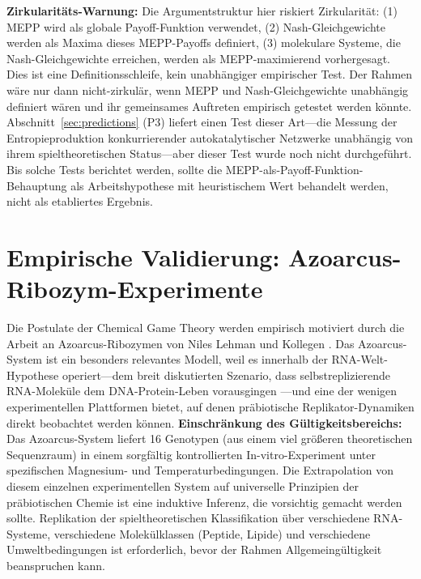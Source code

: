 \documentclass[12pt,a4paper]{article}
\theoremstyle{remark}
\begin{document}
\textbf{Zirkularit\"ats-Warnung:} Die Argumentstruktur hier riskiert Zirkularit\"at: (1) MEPP wird als globale Payoff-Funktion verwendet, (2) Nash-Gleichgewichte werden als Maxima dieses MEPP-Payoffs definiert, (3) molekulare Systeme, die Nash-Gleichgewichte erreichen, werden als MEPP-maximierend vorhergesagt. Dies ist eine Definitionsschleife, kein unabh\"angiger empirischer Test. Der Rahmen w\"are nur dann nicht-zirkul\"ar, wenn MEPP und Nash-Gleichgewichte unabh\"angig definiert w\"aren und ihr gemeinsames Auftreten empirisch getestet werden k\"onnte. Abschnitt~\ref{sec:predictions} (P3) liefert einen Test dieser Art---die Messung der Entropieproduktion konkurrierender autokatalytischer Netzwerke unabh\"angig von ihrem spieltheoretischen Status---aber dieser Test wurde noch nicht durchgef\"uhrt. Bis solche Tests berichtet werden, sollte die MEPP-als-Payoff-Funktion-Behauptung als Arbeitshypothese mit heuristischem Wert behandelt werden, nicht als etabliertes Ergebnis.

\section{Empirische Validierung: Azoarcus-Ribozym-Experimente}
\label{sec:azoarcus}

Die Postulate der Chemical Game Theory werden empirisch motiviert durch die Arbeit an Azoarcus-Ribozymen von Niles Lehman und Kollegen \citep{AzoarcusPNAS,AzoarcusPMC}. Das Azoarcus-System ist ein besonders relevantes Modell, weil es innerhalb der RNA-Welt-Hypothese operiert---dem breit diskutierten Szenario, dass selbstreplizierende RNA-Molek\"ule dem DNA-Protein-Leben vorausgingen \citep{Eigen1979}---und eine der wenigen experimentellen Plattformen bietet, auf denen pr\"abiotische Replikator-Dynamiken direkt beobachtet werden k\"onnen. \textbf{Einschr\"ankung des G\"ultigkeitsbereichs:} Das Azoarcus-System liefert 16 Genotypen (aus einem viel gr\"o\ss{}eren theoretischen Sequenzraum) in einem sorgf\"altig kontrollierten In-vitro-Experiment unter spezifischen Magnesium- und Temperaturbedingungen. Die Extrapolation von diesem einzelnen experimentellen System auf universelle Prinzipien der pr\"abiotischen Chemie ist eine induktive Inferenz, die vorsichtig gemacht werden sollte. Replikation der spieltheoretischen Klassifikation \"uber verschiedene RNA-Systeme, verschiedene Molek\"ulklassen (Peptide, Lipide) und verschiedene Umweltbedingungen ist erforderlich, bevor der Rahmen Allgemeing\"ultigkeit beanspruchen kann.
\end{document}
